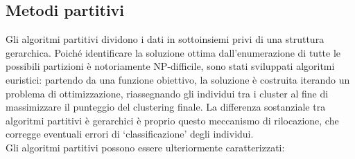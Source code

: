 \subsection{Metodi partitivi}
Gli algoritmi partitivi dividono i dati in sottoinsiemi privi di una struttura gerarchica. Poich\'e identificare la soluzione ottima dall'enumerazione di tutte le possibili partizioni \`e notoriamente \mbox{NP-difficile}, sono stati sviluppati algoritmi euristici: partendo da una funzione obiettivo, la soluzione \`e costruita iterando un problema di ottimizzazione, riassegnando gli individui tra i cluster al fine di massimizzare il punteggio del clustering finale. La differenza sostanziale tra algoritmi partitivi \`e gerarchici \`e proprio questo meccanismo di rilocazione, che corregge eventuali errori di `classificazione' degli individui.\\
Gli algoritmi partitivi possono essere ulteriormente caratterizzati:
